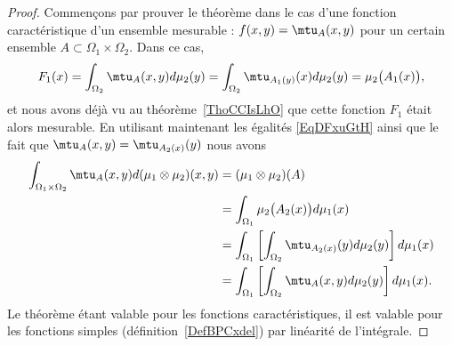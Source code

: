 \begin{proof}
    Commençons par prouver le théorème dans le cas d'une fonction caractéristique d'un ensemble mesurable : \( f(x,y)=\mtu_{A}(x,y)\) pour un certain ensemble \( A\subset \Omega_1\times \Omega_2\). Dans ce cas,
    \begin{equation}
        F_1(x)=\int_{\Omega_2}\mtu_A(x,y)d\mu_2(y)=\int_{\Omega_2}\mtu_{A_1(y)}(x)d\mu_2(y)=\mu_2\big( A_1(x) \big),
    \end{equation}
    et nous avons déjà vu au théorème~\ref{ThoCCIsLhO} que cette fonction \( F_1\) était alors mesurable. En utilisant maintenant les égalités \eqref{EqDFxuGtH} ainsi que le fait que \( \mtu_A(x,y)=\mtu_{A_2(x)}(y)\) nous avons
    \begin{subequations}
        \begin{align}
            \int_{\Omega_1\times \Omega_2}\mtu_A(x,y)d(\mu_1\otimes \mu_2)(x,y)&=(\mu_1\otimes \mu_2)(A)\\
            &=\int_{\Omega_1}\mu_2\big( A_2(x) \big)d\mu_1(x)\\
            &=\int_{\Omega_1}\left[   \int_{\Omega_2}\mtu_{A_2(x)}(y)d\mu_2(y)  \right]d\mu_1(x)\\
            &=\int_{\Omega_1}\left[ \int_{\Omega_2}\mtu_A(x,y)d\mu_2(y) \right]d\mu_1(x).
        \end{align}
    \end{subequations}
    Le théorème étant valable pour les fonctions caractéristiques, il est valable pour les fonctions simples (définition~\ref{DefBPCxdel}) par linéarité de l'intégrale.


\end{proof}
